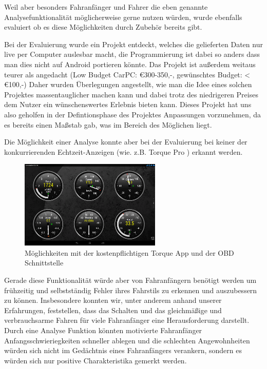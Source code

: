 Weil aber besonders Fahranfänger und Fahrer die eben genannte Analysefunktionalität möglicherweise gerne nutzen würden, wurde ebenfalls evaluiert ob es diese Möglichkeiten durch Zubehör bereits gibt.

Bei der Evaluierung wurde ein Projekt entdeckt, welches die gelieferten Daten nur live per Computer auslesbar macht, die Programmierung ist dabei so anders dass man dies nicht auf Android portieren könnte. Das Projekt ist außerdem weitaus teurer als angedacht (Low Budget CarPC: €300-350,-, gewünschtes Budget: < €100,-) Daher wurden Überlegungen angestellt, wie man die Idee eines solchen Projektes massentauglicher machen kann und dabei trotz des niedrigeren Preises dem Nutzer ein wünschenswertes Erlebnis bieten kann. \cite{SIMR.CH1-Fahrstil-Analyse.LowBudgetCarPC} Dieses Projekt hat uns also geholfen in der Defintionsphase des Projektes Anpassungen vorzunehmen, da es bereits einen Maßstab gab, was im Bereich des Möglichen liegt.

Die Möglichkeit einer Analyse konnte aber bei der Evaluierung bei keiner der konkurrierenden Echtzeit-Anzeigen (wie. z.B. Torque Pro \cite{SIMR.CH1-Fahrstil-Analyse.TorquePro}) erkannt werden. 

\begin{figure}[!htb]\centering
	\includegraphics[width=0.6\textwidth]{images/torquePro}
	\caption{Möglichkeiten mit der kostenpflichtigen Torque App  und der OBD Schnittstelle \cite{SIMR.CH1-Fahrstil-Analyse.TorquePro}}\label{Fig:imgGTR}
\end{figure}

Gerade diese Funktionalität würde aber von Fahranfängern benötigt werden um frühzeitig und selbstständig Fehler ihres Fahrstils zu erkennen und auszubessern zu können. Insbesondere konnten wir, unter anderem anhand unserer Erfahrungen, feststellen, dass das Schalten und das gleichmäßige und verbrauchsarme Fahren für viele Fahranfänger eine Herausforderung darstellt. Durch eine Analyse Funktion könnten motivierte Fahranfänger Anfangsschwieriegkeiten schneller ablegen und die schlechten Angewohnheiten würden sich nicht im  Gedächtnis eines Fahranfängers verankern, sondern es würden sich nur positive Charakteristika gemerkt werden.  

